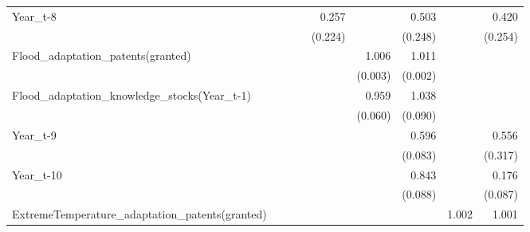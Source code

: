 \begin{table}[htbp]
\begin{tabular}{l*{8}{D{.}{.}{-1}}}
Year\_t-8    &                     &                     &                     &       0.257         &                     &       0.503         &                     &       0.420         \\
            &                     &                     &                     &     (0.224)         &                     &     (0.248)         &                     &     (0.254)         \\
Flood\_adaptation\_patents(granted)&                     &                     &                     &                     &       1.006\sym{*}  &       1.011\sym{***}&                     &                     \\
            &                     &                     &                     &                     &     (0.003)         &     (0.002)         &                     &                     \\
Flood\_adaptation\_knowledge\_stocks(Year\_t-1)&                     &                     &                     &                     &       0.959         &       1.038         &                     &                     \\
            &                     &                     &                     &                     &     (0.060)         &     (0.090)         &                     &                     \\
Year\_t-9    &                     &                     &                     &                     &                     &       0.596\sym{***}&                     &       0.556         \\
            &                     &                     &                     &                     &                     &     (0.083)         &                     &     (0.317)         \\
Year\_t-10   &                     &                     &                     &                     &                     &       0.843         &                     &       0.176\sym{***}\\
            &                     &                     &                     &                     &                     &     (0.088)         &                     &     (0.087)         \\
ExtremeTemperature\_adaptation\_patents(granted)&                     &                     &                     &                     &                     &                     &       1.002\sym{*}  &       1.001\sym{*}  \\

\end{tabular}
\end{table}
